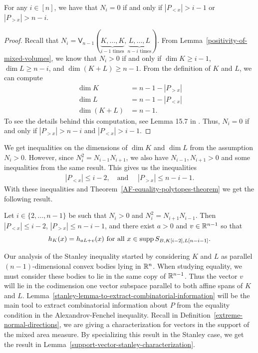 \documentclass{puthesis-UG}
\begin{document}
\begin{lem} 
	For any $i \in [n]$, we have that $N_i = 0$ if and only if $|P_{< x}| > i-1$ or $|P_{> x}| > n-i$. 
\end{lem}

\begin{proof}
	Recall that $N_i = \mathsf{V}_{n-1} (\underbrace{K, \ldots, K}_{i-1 \text{ times}}, \underbrace{L, \ldots, L}_{n-i \text{ times}})$. From Lemma~\ref{positivity-of-mixed-volumes}, we know that $N_i > 0$ if and only if $\dim K \geq i-1$, $\dim L \geq n-i$, and $\dim (K+L) \geq n-1$. From the definition of $K$ and $L$, we can compute
	\begin{align*}
		\dim K & = n-1-|P_{> x}| \\
		\dim L & = n-1 - |P_{< x}| \\
		\dim (K+L) & = n-1. 
	\end{align*} 
	To see the details behind this computation, see Lemma 15.7 in \cite{shenfeld2022extremals}. Thus, $N_i = 0$ if and only if $|P_{> x}| > n-i$ and $|P_{<x}| > i-1$. 
\end{proof}

We get inequalities on the dimensions of $\dim K$ and $\dim L$ from the assumption $N_i > 0$. However, since $N_i^2 = N_{i-1}N_{i+1}$, we also have $N_{i-1}, N_{i+1} > 0$ and some inequalities from the same result. This gives us the inequalities
\begin{align*}
	|P_{< x}| \leq i-2, \quad \text{and } \quad |P_{>x}| \leq n-i-1. 
\end{align*}
With these inequalities and Theorem~\ref{AF-equality-polytopes-theorem} we get the following result.

\begin{lem}  \label{stanley-lemma-to-extract-combinatorial-information}
	Let $i \in \{2, \ldots, n-1\}$ be such that $N_i > 0$ and $N_i^2 = N_{i+1} N_{i-1}$. Then $|P_{<x}| \leq i-2$, $|P_{>x}| \leq n-i-1$, and there exist $a > 0$ and $v \in \mathbb{R}^{n-1}$ so that 
	\[
		h_K(x) = h_{aL + v}(x) \text{ for all } x \in \operatorname{supp} S_{B, K[i-2], L[n-i-1]}.
	\]

\end{lem}

Our analysis of the Stanley inequality started by considering $K$ and $L$ as parallel $(n-1)$-dimensional convex bodies lying in $\mathbb{R}^n$. When studying equality, we must consider these bodies to lie in the same copy of $\mathbb{R}^{n-1}$. Thus the vector $v$ will lie in the codimension one vector subspace parallel to both affine spans of $K$ and $L$. Lemma~\ref{stanley-lemma-to-extract-combinatorial-information} will be the main tool to extract combinatorial information about $P$ from the equality condition in the Alexandrov-Fenchel inequality. Recall in Definition~\ref{extreme-normal-directions}, we are giving a characterization for vectors in the support of the mixed area measure. By specializing this result in the Stanley case, we get the result in Lemma~\ref{support-vector-stanley-characterization}. 
\end{document}

